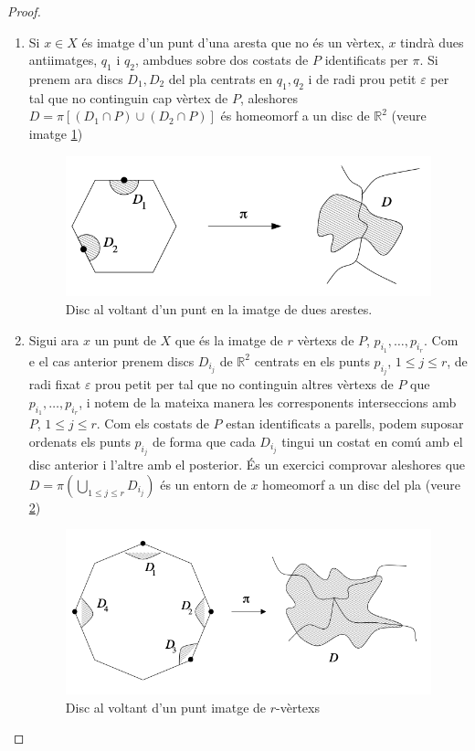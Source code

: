 \documentclass[../main.tex]{subfiles}
\begin{document}
\begin{proof}
\begin{enumerate}
    \item Si $x\in X$ és imatge d'un punt d'una aresta que no és un vèrtex, $x$ tindrà dues antiimatges, $q_1$ i $q_2$, ambdues sobre dos costats de $P$ identificats per $\pi$. Si prenem ara discs $D_1,D_2$ del pla centrats en $q_1,q_2$ i de radi prou petit $\varepsilon$ per tal que no continguin cap vèrtex de $P$, aleshores $D = \pi[(D_1\cap P)\cup (D_2\cap P)]$ és homeomorf a un disc de $\mathbb{R}^2$ (veure imatge \ref{fig:d1d2})
    \begin{figure}
        \centering
        \includegraphics{fotos_topo_2/d1d2.png}
        \caption{Disc al voltant d'un punt en la imatge de dues arestes.}
        \label{fig:d1d2}
    \end{figure}
    \item Sigui ara $x$ un punt de $X$ que és la imatge de $r$ vèrtexs de $P$, $p_{i_1},\ldots,p_{i_r}$. Com e el cas anterior prenem discs $D_{i_j}$ de $\mathbb{R}^2$ centrats en els punts $p_{i_j}$, $1\leq j\leq r$, de radi fixat $\varepsilon$ prou petit per tal que no continguin altres vèrtexs de $P$ que $p_{i_1},\ldots,p_{i_r}$, i notem de la mateixa manera les corresponents interseccions amb $P$, $1\leq j\leq r$. Com els costats de $P$ estan identificats a parells, podem suposar ordenats els punts $p_{i_j}$ de forma que cada $D_{i_j}$ tingui un costat en comú amb el disc anterior i l'altre amb el posterior. És un exercici comprovar aleshores que $D = \pi\left(\bigcup_{1\leq j\leq r}D_{i_j}\right)$ és un entorn de $x$ homeomorf a un disc del pla (veure \ref{fig:discos})
    \begin{figure}
        \centering
        \includegraphics{fotos_topo_2/discos.png}
        \caption{Disc al voltant d'un punt imatge de $r$-vèrtexs}
        \label{fig:discos}
    \end{figure}
    

\end{enumerate}
\end{proof}
\end{document}
